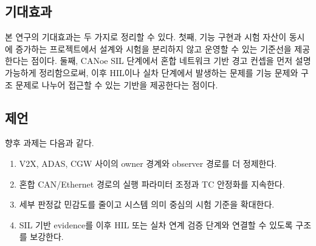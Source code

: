 \documentclass[10pt,a4paper,twocolumn]{article}
\begin{document}
\subsection{기대효과}

본 연구의 기대효과는 두 가지로 정리할 수 있다. 첫째, 기능 구현과 시험 자산이 동시에 증가하는 프로젝트에서 설계와 시험을 분리하지 않고 운영할 수 있는 기준선을 제공한다는 점이다. 둘째, CANoe SIL 단계에서 혼합 네트워크 기반 경고 컨셉을 먼저 설명 가능하게 정리함으로써, 이후 HIL이나 실차 단계에서 발생하는 문제를 기능 문제와 구조 문제로 나누어 접근할 수 있는 기반을 제공한다는 점이다.

\subsection{제언}

향후 과제는 다음과 같다.

\begin{enumerate}[label=\arabic*.]
\item V2X, ADAS, CGW 사이의 owner 경계와 observer 경로를 더 정제한다.
\item 혼합 CAN/Ethernet 경로의 실행 파라미터 조정과 TC 안정화를 지속한다.
\item 세부 판정값 민감도를 줄이고 시스템 의미 중심의 시험 기준을 확대한다.
\item SIL 기반 evidence를 이후 HIL 또는 실차 연계 검증 단계와 연결할 수 있도록 구조를 보강한다.
\end{enumerate}
\end{document}
